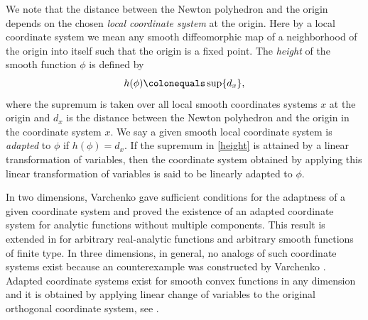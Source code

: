 \documentclass[a4paper, 11pt]{article}
\theoremstyle{plain}
\theoremstyle{definition}
\theoremstyle{lemma}
\theoremstyle{Remark}
\theoremstyle{proposition}
\theoremstyle{corollary}
\theoremstyle{example}
\theoremstyle{assumption}
\begin{document}
We note that the distance between the Newton polyhedron and the origin depends on the chosen \emph{local coordinate system} at the origin. Here by a local coordinate system we mean any smooth diffeomorphic map of a neighborhood of the origin into itself such that the origin is a fixed point.  The \emph{height} of the smooth function $\phi$ is defined by
\begin{equation}\label{height}h(\phi)\colonequals \sup\{d_x\},
\end{equation}
where the supremum is taken over all local smooth coordinates systems $x$ at the origin and $d_x$ is the distance between the Newton polyhedron and the origin in the  coordinate system $x$. We say a given smooth local coordinate system is \emph{adapted} to $\phi$ if $h(\phi)=d_x.$
If the supremum in \eqref{height} is attained  by a linear transformation of variables, then the  coordinate system obtained by applying this  linear transformation of variables  is said to be linearly adapted to $\phi$. %


In two dimensions, Varchenko \cite{Var} gave sufficient conditions for the adaptness of a given coordinate system and proved the existence of an adapted coordinate system for analytic functions without multiple components. This result is extended in \cite{Adap} for arbitrary real-analytic functions and arbitrary smooth functions of finite type.  In three dimensions, in general, no analogs of such coordinate
systems exist because an counterexample was constructed  by  Varchenko \cite{Var}. Adapted coordinate systems exist for  smooth convex functions in any dimension and it is obtained by applying linear change of variables to the original orthogonal coordinate system, see \cite{Sch, I.U}.
\end{document}
